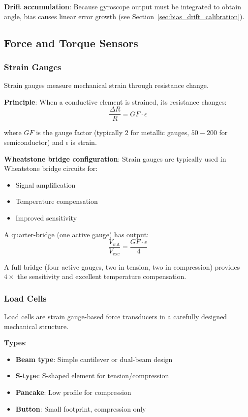 \textbf{Drift accumulation}: Because gyroscope output must be integrated to obtain angle, bias causes linear error growth (see Section~\ref{sec:bias_drift_calibration}).

\subsection{Force and Torque Sensors}

\subsubsection{Strain Gauges}

Strain gauges measure mechanical strain through resistance change.

\textbf{Principle}: When a conductive element is strained, its resistance changes:
\begin{equation}
\frac{\Delta R}{R} = GF \cdot \epsilon
\label{eq:strain_gauge}
\end{equation}

where $GF$ is the gauge factor (typically $2$ for metallic gauges, $50-200$ for semiconductor) and $\epsilon$ is strain.

\textbf{Wheatstone bridge configuration}: Strain gauges are typically used in Wheatstone bridge circuits for:
\begin{itemize}
    \item Signal amplification
    \item Temperature compensation
    \item Improved sensitivity
\end{itemize}

A quarter-bridge (one active gauge) has output:
\begin{equation}
\frac{V_{\text{out}}}{V_{\text{exc}}} = \frac{GF \cdot \epsilon}{4}
\label{eq:quarter_bridge}
\end{equation}

A full bridge (four active gauges, two in tension, two in compression) provides $4\times$ the sensitivity and excellent temperature compensation.

\subsubsection{Load Cells}

Load cells are strain gauge-based force transducers in a carefully designed mechanical structure.

\textbf{Types}:
\begin{itemize}
    \item \textbf{Beam type}: Simple cantilever or dual-beam design
    \item \textbf{S-type}: S-shaped element for tension/compression
    \item \textbf{Pancake}: Low profile for compression
    \item \textbf{Button}: Small footprint, compression only
\end{itemize}

